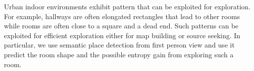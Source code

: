 Urban indoor environments exhibit pattern that can be exploited for exploration.
For example, hallways are often elongated rectangles that lead to other rooms
while rooms are often close to a square and a dead end.
Such patterns can be exploited for efficient exploration either for map building
or source seeking.
In particular, we use semantic place detection from first person view and use it
predict the room shape and the possible entropy gain from exploring such a room.
